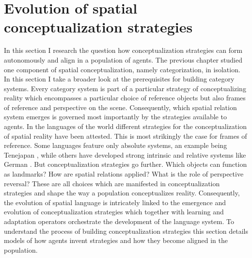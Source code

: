 %

\chapter{Evolution of spatial conceptualization strategies}
\label{s:strategies}
In this section I research the question how conceptualization strategies
can form autonomously and align in a population of agents. The previous
chapter studied one component of spatial conceptualization,
namely categorization, in isolation. In this section I take a broader look at  
the prerequisites for building category systems. Every category system
is part of a particular strategy of conceptualizing reality which encompasses
a particular choice of reference objects but also frames of reference and
perspective on the scene. Consequently, which spatial relation system
emerges is governed most importantly by the strategies available to agents.
In the languages of the world different strategies for the 
conceptualization of spatial reality have been attested. This is most strikingly the case 
for frames of reference. Some languages feature only absolute systems, an example being
Tenejapan \citep{levinson2003space}, while others have developed strong intrinsic and 
relative systems like German \citep{tenbrink2007space}.
But conceptualization strategies go further. Which objects can function as landmarks?
How are spatial relations applied? What is the role of perspective reversal? 
These are all choices which are manifested in conceptualization strategies and shape
the way a population conceptualizes reality.
Consequently, the evolution of spatial language is intricately linked to the 
emergence and evolution of conceptualization strategies which together
with learning and adaptation operators orchestrate the development of the language system.
To understand the process of building conceptualization strategies this section 
details models of how agents invent strategies and how
they become aligned in the population.

